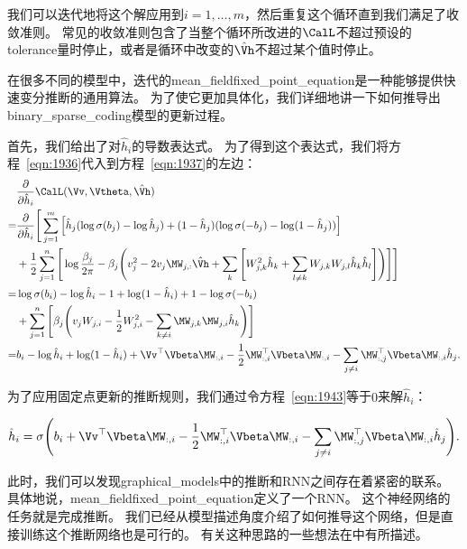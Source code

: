 我们可以迭代地将这个解应用到$i = 1,\ldots,m$，然后重复这个循环直到我们满足了收敛准则。
常见的收敛准则包含了当整个循环所改进的$\CalL$不超过预设的\gls{tolerance}量时停止，或者是循环中改变的$\hat{\Vh}$不超过某个值时停止。

在很多不同的模型中，迭代的\gls{mean_field}\gls{fixed_point_equation}是一种能够提供快速变分推断的通用算法。
为了使它更加具体化，我们详细地讲一下如何推导出\gls{binary_sparse_coding}模型的更新过程。


首先，我们给出了对$\hat{h}_i$的导数表达式。
为了得到这个表达式，我们将方程~\eqref{eqn:1936}代入到方程~\eqref{eqn:1937}的左边：
\begin{align}
& \frac{\partial}{\partial \hat{h}_i} \CalL (\Vv,\Vtheta,\hat{\Vh})    \\
= & \frac{\partial}{\partial \hat{h}_i} \Bigg[\sum_{j=1}^{m}\Big[\hat{h}_j (\log \sigma(b_j) - \log \hat{h}_j) + (1 - \hat{h}_j)(\log \sigma(-b_j) - \log (1-\hat{h}_j))\Big] \\
& + \frac{1}{2} \sum_{j=1}^{n} \Bigg[ \log {\frac{\beta_j}{2\pi}} - \beta_j \Bigg(v_j^2 - 2 v_j \MW_{j,:}\hat{\Vh} + \sum_{k}\Bigg[W^2_{j,k}\hat{h}_k + \sum_{l \neq k}W_{j,k}W_{j,l}\hat{h}_k\hat{h}_l \Bigg] \Bigg) \Bigg]\Bigg] \\
= & \log \sigma(b_i) - \log \hat{h}_i - 1 + \log (1 - \hat{h}_i ) + 1 - \log \sigma (- b_i ) \\
 & + \sum_{j=1}^{n} \Bigg[\beta_j \Bigg(v_j W_{j,i} - \frac{1}{2} W_{j,i}^2 - \sum_{k \neq i} \MW_{j,k}\MW_{j,i} \hat{h}_k\Bigg) \Bigg]\\
 = & b_i - \log \hat{h}_i + \log (1 - \hat{h}_i ) + \Vv^{\top} {\Vbeta} \MW_{:,i} - \frac{1}{2} \MW_{:,i}^{\top} {\Vbeta}\MW_{:,i} -\sum_{j\neq i}\MW^{\top}_{:,j}{\Vbeta}\MW_{:,i}\hat{h}_j.
 \label{eqn:1943}
\end{align}

为了应用固定点更新的推断规则，我们通过令方程~\eqref{eqn:1943}等于$0$来解$\hat{h}_i$：

\begin{align}
\label{eqn:1944}
\hat{h}_i = \sigma\Bigg(b_i + \Vv^{\top} {\Vbeta} \MW_{:,i} - \frac{1}{2} \MW_{:,i}^{\top} {\Vbeta} \MW_{:,i} - \sum_{j \neq i }  \MW_{:,j}^{\top} {\Vbeta}  \MW_{:,i} \hat{h}_j \Bigg).
\end{align}

此时，我们可以发现\gls{graphical_models}中的推断和\gls{RNN}之间存在着紧密的联系。
具体地说，\gls{mean_field}\gls{fixed_point_equation}定义了一个\gls{RNN}。
这个神经网络的任务就是完成推断。
我们已经从模型描述角度介绍了如何推导这个网络，但是直接训练这个推断网络也是可行的。
有关这种思路的一些想法在中有所描述。

